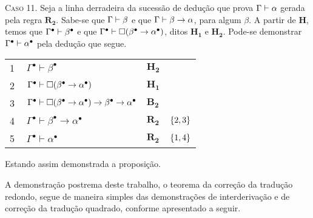 \begin{tcolorbox}[enhanced jigsaw, breakable, sharp corners, colframe=black, colback=white, boxrule=0.5pt, left=1.5mm, right=1.5mm, top=1.5mm, bottom=1.5mm]
        \vspace{.5\baselineskip}
        \textsc{Caso 11.}
        Seja a linha derradeira da sucessão de dedução que prova $\Gamma\mathrel{\vdash}\alpha$ gerada pela regra $\hyperref[intuitionistic.rule.2]{\mathbf{R_2}}$.
        Sabe-se que $\Gamma\mathrel{\vdash}\beta$ e que $\Gamma\mathrel{\vdash}\beta\to\alpha$, para algum $\beta$.
        A partir de $\mathbf{H}$, temos que $\Gamma^\bullet\mathrel{\vdash}\beta^\bullet$ e que $\Gamma^\bullet\mathrel{\vdash}\Box(\beta^\bullet\to\alpha^\bullet)$, ditos $\mathbf{H_1}$ e $\mathbf{H_2}$.
        Pode-se demonstrar $\Gamma^\bullet\mathrel{\vdash}\alpha^\bullet$ pela dedução que segue.

        \vspace{\baselineskip}
        \footnotesize
        \setlength{\rowskip}{.5\baselineskip}
        \begin{tabularx}{\textwidth}{r | X l l}
            \scriptsize{\phantom{0}1}\phantom{ } & $\ \Gamma^\bullet \vdash \beta^\bullet$ & $\mathbf{H_2}$\phantom{1}                & \phantom{$\set{00,00}$}\\[\rowskip]
            \scriptsize{\phantom{0}2}\phantom{ } & $\ \Gamma^\bullet \vdash \nec(\beta^\bullet\to\alpha^\bullet)$ & $\mathbf{H_1}$ & \\[\rowskip]
            \scriptsize{\phantom{0}3}\phantom{ } & $\ \Gamma^\bullet \vdash \nec(\beta^\bullet\to\alpha^\bullet)\to\beta^\bullet\to\alpha^\bullet$ & $\hyperref[modal.axiom.modal.2]{\mathbf{B_2}}$ & \\[\rowskip]
            \scriptsize{\phantom{0}4}\phantom{ } & $\ \Gamma^\bullet \vdash \beta^\bullet\to\alpha^\bullet$ & $\hyperref[modal.rule.2]{\mathbf{R_2}}$ & $\left\{2,3\right\}$\\[\rowskip]
            \scriptsize{\phantom{0}5}\phantom{ } & $\ \Gamma^\bullet \vdash \alpha^\bullet$ & $\hyperref[modal.rule.2]{\mathbf{R_2}}$ & $\left\{1,4\right\}$
        \end{tabularx}
        \normalsize

        \vspace{\baselineskip}
        Estando assim demonstrada a proposição.
    \end{tcolorbox}

    \vspace{.5\baselineskip}
    A demonstração postrema deste trabalho, o teorema da correção da tradução redondo, segue de maneira simples das demonstrações de interderivação e de correção da tradução quadrado, conforme apresentado a seguir.

